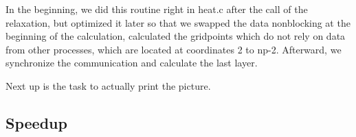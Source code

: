 In the beginning, we did this routine right in heat.c after the call of the relaxation, but optimized it later so that we swapped the data nonblocking at the beginning of the calculation, calculated the gridpoints which do not rely on data from other processes, which are located at coordinates 2 to np-2. Afterward, we synchronize the communication and calculate the last layer.

Next up is the task to actually print the picture. %

\subsection*{Speedup}
